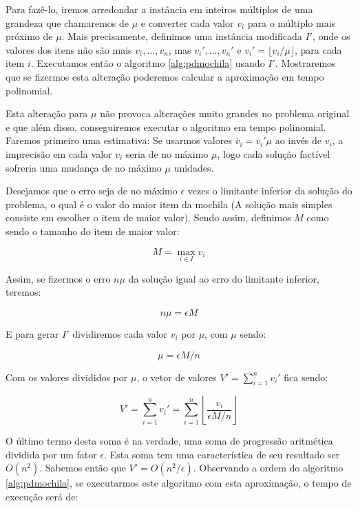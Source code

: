 Para fazê-lo, iremos arredondar a instância em inteiros múltiplos de uma grandeza que chamaremos de $\mu$ e converter cada valor $v_i$ para o múltiplo mais próximo de $\mu$. Mais precisamente, definimos uma instância modificada $I'$, onde os valores dos itens não são mais $v_i,\ldots,v_n$, mas $v_i',\ldots,v_n'$ e $v_i' = \lfloor v_i / \mu \rfloor$, para cada item $i$. Executamos então o algoritmo \ref{alg:pdmochila} usando $I'$. Mostraremos que se fizermos esta alteração poderemos calcular a aproximação em tempo polinomial.

Esta alteração para $\mu$ não provoca alterações muito grandes no problema original e que além disso, conseguiremos executar o algoritmo em tempo polinomial. Faremos primeiro uma estimativa: Se usarmos valores $\tilde{v_i} = v_i'\mu$ ao invés de $v_i$, a imprecisão em cada valor $v_i$ seria de no máximo $\mu$, logo cada solução factível sofreria uma mudança de no máximo $\mu$ unidades.

Desejamos que o erro seja de no máximo $\epsilon$ vezes o limitante inferior da solução do problema, o qual é o valor do maior item da mochila (A solução mais simples consiste em escolher o item de maior valor). Sendo assim, definimos $M$ como sendo o tamanho do item de maior valor:

\begin{equation} 
M = \max_{i \in I} v_i
\end{equation}

Assim, se fizermos o erro $n\mu$ da solução igual ao erro do limitante inferior, teremos:

\begin{equation}
n\mu = \epsilon M
\end{equation}

E para gerar $I'$ dividiremos cada valor $v_i$ por $\mu$, com $\mu$ sendo:

\begin{equation}
\mu = \epsilon M / n
\end{equation}

Com os valores divididos por $\mu$, o vetor de valores $V' = \sum_{i=1}^{n} v_i'$ fica sendo:

\begin{equation}
V' = \sum_{i=1}^{n} v_i' = \sum_{i=1}^n \left\lfloor \frac{v_i}{\epsilon M / n} \right\rfloor
\end{equation}

O último termo desta soma é na verdade, uma soma de progressão aritmética dividida por um fator $\epsilon$. Esta soma tem uma característica de seu resultado ser $O(n^2)$. Sabemos então que $V' = O(n^2/ \epsilon)$. Observando a ordem do algoritmo \ref{alg:pdmochila}, se executarmos este algoritmo com esta aproximação, o tempo de execução será de:

